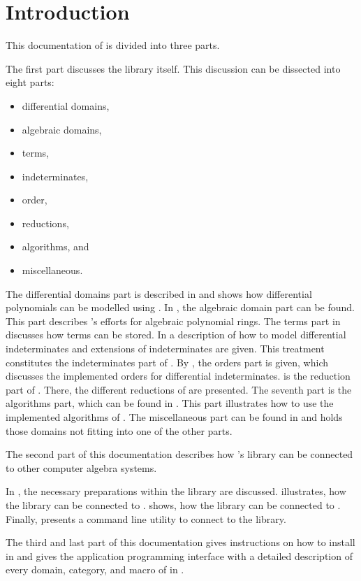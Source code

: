 \clearpage
\section{Introduction}

This documentation of \LibCharSet is divided into three parts.

The first part discusses the \LibCharSet library itself. This discussion can be dissected into eight parts: 
\begin{itemize}
\item differential domains,
\item algebraic domains,
\item terms,
\item indeterminates, 
\item order,
\item reductions,
\item algorithms, and
\item miscellaneous.
\end{itemize}


The differential domains part is described in  and shows how differential polynomials can be modelled using \LibCharSet. In , the algebraic domain part can be found. This part describes \LibCharSet's efforts for algebraic polynomial rings. The terms part in  discusses how terms can be stored. In  a description of how to model differential indeterminates and extensions of indeterminates are given. This treatment constitutes the indeterminates part of \LibCharSet. By , the orders part is given, which discusses the implemented orders for differential indeterminates.  is the reduction part of \LibCharSet. There, the different reductions of \LibCharSet are presented. The seventh part is the algorithms part, which can be found in . This part illustrates how to use the implemented algorithms of \LibCharSet. The miscellaneous part can be found in  and holds those domains not fitting into one of the other parts.

The second part of this documentation describes how \Aldor's \LibCharSet library can be connected to other computer algebra systems.

In , the necessary preparations within the \LibCharSet library are discussed.  illustrates, how the \LibCharSet library can be connected to \Maple.  shows, how the \LibCharSet library can be connected to \Mathematica. Finally,  presents a command line utility to connect to the \LibCharSet library.

The third and last part of this documentation gives instructions on how to install \LibCharSet in  and gives the application programming interface with a detailed description of every domain, category, and macro of \LibCharSet in .

